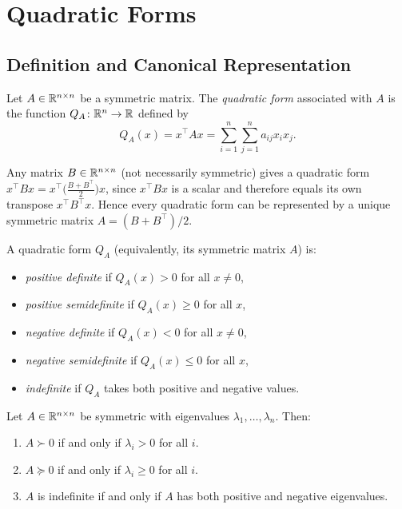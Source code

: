 \documentclass[11pt,a4paper]{article}
\begin{document}
\section{Quadratic Forms}
\label{sec:quadratic_forms}

\subsection{Definition and Canonical Representation}

\begin{definition}
\label{def:quadratic_form}
Let $A \in \mathbb{R}^{n \times n}$ be a symmetric matrix.  The
\emph{quadratic form} associated with $A$ is the function
$Q_A\colon \mathbb{R}^n \to \mathbb{R}$ defined by
\[
  Q_A(x) = x^\top A x = \sum_{i=1}^n \sum_{j=1}^n a_{ij} x_i x_j.
\]
\end{definition}

\begin{remark}
\label{rem:symmetrize}
Any matrix $B \in \mathbb{R}^{n \times n}$ (not necessarily symmetric) gives
a quadratic form $x^\top B x = x^\top \bigl(\frac{B + B^\top}{2}\bigr) x$,
since $x^\top B x$ is a scalar and therefore equals its own transpose
$x^\top B^\top x$.  Hence every quadratic form can be represented by a
unique symmetric matrix $A = (B + B^\top)/2$.
\end{remark}

\begin{definition}
\label{def:classification_qf}
A quadratic form $Q_A$ (equivalently, its symmetric matrix $A$) is:
\begin{itemize}[nosep]
  \item \emph{positive definite} if $Q_A(x) > 0$ for all $x \neq 0$,
  \item \emph{positive semidefinite} if $Q_A(x) \geq 0$ for all $x$,
  \item \emph{negative definite} if $Q_A(x) < 0$ for all $x \neq 0$,
  \item \emph{negative semidefinite} if $Q_A(x) \leq 0$ for all $x$,
  \item \emph{indefinite} if $Q_A$ takes both positive and negative values.
\end{itemize}
\end{definition}

\begin{proposition}
\label{prop:eigenvalue_classification}
Let $A \in \mathbb{R}^{n \times n}$ be symmetric with eigenvalues
$\lambda_1, \ldots, \lambda_n$.  Then:
\begin{enumerate}[nosep]
  \item $A \succ 0$ if and only if $\lambda_i > 0$ for all $i$.
  \item $A \succeq 0$ if and only if $\lambda_i \geq 0$ for all $i$.
  \item $A$ is indefinite if and only if $A$ has both positive and
        negative eigenvalues.
\end{enumerate}
\end{proposition}
\end{document}
